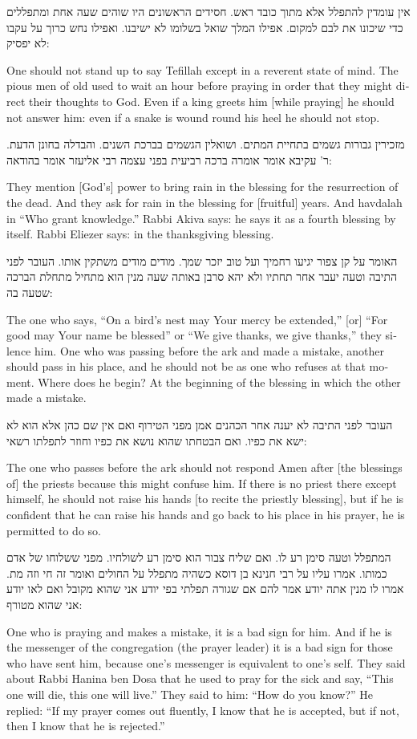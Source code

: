 \documentclass[12pt, openany]{book}
\newcommand{\textblock}[2]{
	{\fontsize{16pt}{20pt}\selectfont #1\\}
	
	\begin{english}
		#2
	\end{english}
	\clearpage
}
\begin{document}
\textblock{אין עומדין להתפלל אלא מתוך כובד ראש. חסידים הראשונים היו שוהים שעה אחת ומתפללים כדי שיכונו את לבם למקום. אפילו המלך שואל בשלומו לא ישיבנו. ואפילו נחש כרוך על עקבו לא יפסיק: }{One should not stand up to say Tefillah except in a reverent state of mind. The pious men of old used to wait an hour before praying in order that they might direct their thoughts to God. Even if a king greets him {[while praying]} he should not answer him: even if a snake is wound round his heel he should not stop.}
\textblock{מזכירין גבורות גשמים בתחיית המתים. ושואלין הגשמים בברכת השנים. והבדלה בחונן הדעת. ר' עקיבא אומר אומרה ברכה רביעית בפני עצמה רבי אליעזר אומר בהודאה: }{They mention {[God’s]} power to bring rain in the blessing for the resurrection of the dead. And they ask for rain in the blessing for {[fruitful]} years. And havdalah in “Who grant knowledge.” Rabbi Akiva says: he says it as a fourth blessing by itself. Rabbi Eliezer says: in the thanksgiving blessing.}
\textblock{האומר על קן צפור יגיעו רחמיך ועל טוב יזכר שמך. מודים מודים משתקין אותו. העובר לפני התיבה וטעה יעבר אחר תחתיו ולא יהא סרבן באותה שעה מנין הוא מתחיל מתחלת הברכה שטעה בה: }{The one who says, “On a bird’s nest may Your mercy be extended,” {[or]} “For good may Your name be blessed” or “We give thanks, we give thanks,” they silence him. One who was passing before the ark and made a mistake, another should pass in his place, and he should not be as one who refuses at that moment. Where does he begin? At the beginning of the blessing in which the other made a mistake.}
\textblock{העובר לפני התיבה לא יענה אחר הכהנים אמן מפני הטירוף ואם אין שם כהן אלא הוא לא ישא את כפיו. ואם הבטחתו שהוא נושא את כפיו וחוזר לתפלתו רשאי: }{The one who passes before the ark should not respond Amen after {[the blessings of]} the priests because this might confuse him. If there is no priest there except himself, he should not raise his hands {[to recite the priestly blessing]}, but if he is confident that he can raise his hands and go back to his place in his prayer, he is permitted to do so.}
\textblock{המתפלל וטעה סימן רע לו. ואם שליח צבור הוא סימן רע לשולחיו. מפני ששלוחו של אדם כמותו. אמרו עליו על רבי חנינא בן דוסא כשהיה מתפלל על החולים ואומר זה חי וזה מת. אמרו לו מנין אתה יודע אמר להם אם שגורה תפלתי בפי יודע אני שהוא מקובל ואם לאו יודע אני שהוא מטורף: }{One who is praying and makes a mistake, it is a bad sign for him. And if he is the messenger of the congregation (the prayer leader) it is a bad sign for those who have sent him, because one’s messenger is equivalent to one’s self. They said about Rabbi Hanina ben Dosa that he used to pray for the sick and say, “This one will die, this one will live.” They said to him: “How do you know?” He replied: “If my prayer comes out fluently, I know that he is accepted, but if not, then I know that he is rejected.”}
\end{document}
